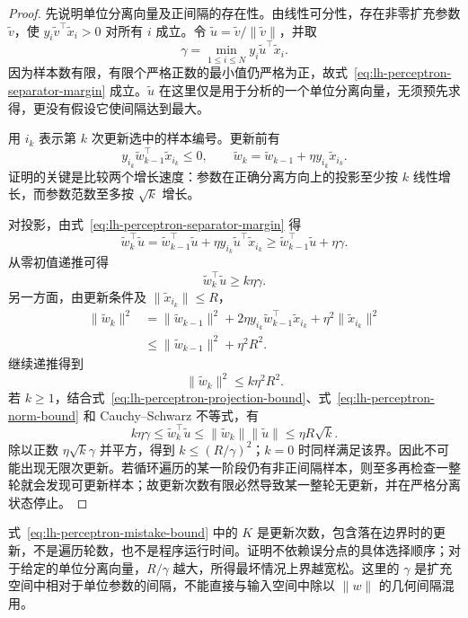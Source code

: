 \begin{proof}
先说明单位分离向量及正间隔的存在性。由线性可分性，存在非零扩充参数 $\widetilde v$，使 $y_i\widetilde v^\top\widetilde x_i>0$ 对所有 $i$ 成立。令 $\widetilde u=\widetilde v/\|\widetilde v\|$，并取
\[
\gamma=\min_{1\leq i\leq N}y_i\widetilde u^\top\widetilde x_i.
\]
因为样本数有限，有限个严格正数的最小值仍严格为正，故式~\eqref{eq:lh-perceptron-separator-margin} 成立。$\widetilde u$ 在这里仅是用于分析的一个单位分离向量，无须预先求得，更没有假设它使间隔达到最大。

用 $i_k$ 表示第 $k$ 次更新选中的样本编号。更新前有
\[
y_{i_k}\widetilde w_{k-1}^\top\widetilde x_{i_k}\leq0,
\qquad
\widetilde w_k=\widetilde w_{k-1}+\eta y_{i_k}\widetilde x_{i_k}.
\]
证明的关键是比较两个增长速度：参数在正确分离方向上的投影至少按 $k$ 线性增长，而参数范数至多按 $\sqrt{k}$ 增长。

对投影，由式~\eqref{eq:lh-perceptron-separator-margin} 得
\[
\widetilde w_k^\top\widetilde u
=\widetilde w_{k-1}^\top\widetilde u
+\eta y_{i_k}\widetilde u^\top\widetilde x_{i_k}
\geq\widetilde w_{k-1}^\top\widetilde u+\eta\gamma.
\]
从零初值递推可得
\begin{equation}
\label{eq:lh-perceptron-projection-bound}
\widetilde w_k^\top\widetilde u\geq k\eta\gamma.
\end{equation}
另一方面，由更新条件及 $\|\widetilde x_{i_k}\|\leq R$，
\[
\begin{aligned}
\|\widetilde w_k\|^2
&=\|\widetilde w_{k-1}\|^2
+2\eta y_{i_k}\widetilde w_{k-1}^\top\widetilde x_{i_k}
+\eta^2\|\widetilde x_{i_k}\|^2\\
&\leq\|\widetilde w_{k-1}\|^2+\eta^2R^2.
\end{aligned}
\]
继续递推得到
\begin{equation}
\label{eq:lh-perceptron-norm-bound}
\|\widetilde w_k\|^2\leq k\eta^2R^2.
\end{equation}
若 $k\geq1$，结合式~\eqref{eq:lh-perceptron-projection-bound}、式~\eqref{eq:lh-perceptron-norm-bound} 和 Cauchy--Schwarz 不等式，有
\[
k\eta\gamma
\leq\widetilde w_k^\top\widetilde u
\leq\|\widetilde w_k\|\|\widetilde u\|
\leq\eta R\sqrt{k}.
\]
除以正数 $\eta\sqrt{k}\gamma$ 并平方，得到 $k\leq(R/\gamma)^2$；$k=0$ 时同样满足该界。因此不可能出现无限次更新。若循环遍历的某一阶段仍有非正间隔样本，则至多再检查一整轮就会发现可更新样本；故更新次数有限必然导致某一整轮无更新，并在严格分离状态停止。
\end{proof}

式~\eqref{eq:lh-perceptron-mistake-bound} 中的 $K$ 是更新次数，包含落在边界时的更新，不是遍历轮数，也不是程序运行时间。证明不依赖误分点的具体选择顺序；对于给定的单位分离向量，$R/\gamma$ 越大，所得最坏情况上界越宽松。这里的 $\gamma$ 是扩充空间中相对于单位参数的间隔，不能直接与输入空间中除以 $\|w\|$ 的几何间隔混用。

